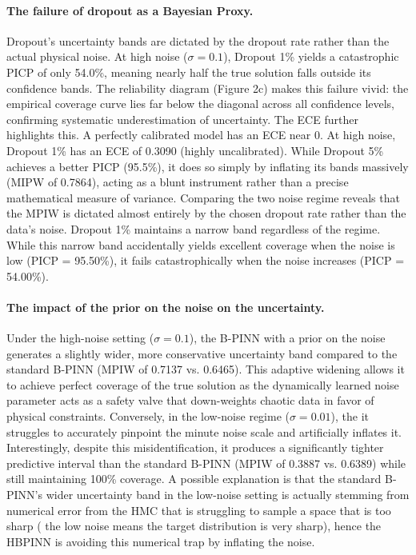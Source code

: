 \documentclass{article}
\begin{document}
\paragraph{The failure of dropout as a Bayesian Proxy.} Dropout's uncertainty bands are dictated by the dropout rate rather than the actual physical noise. At high noise ($\sigma=0.1$), Dropout 1\% yields a catastrophic PICP of only 54.0\%, meaning nearly half the true solution falls outside its confidence bands. The reliability diagram (Figure 2c) makes this failure vivid: the empirical coverage curve lies far below the diagonal across all confidence levels, confirming systematic underestimation of uncertainty. The ECE further highlights this. A perfectly calibrated model has an ECE near 0. At high noise, Dropout 1\% has an ECE of 0.3090 (highly uncalibrated). While Dropout 5\% achieves a better PICP (95.5\%), it does so simply by inflating its bands massively (MIPW of 0.7864), acting as a blunt instrument rather than a precise mathematical measure of variance. Comparing the two noise regime reveals that the MPIW  is dictated almost entirely by the chosen dropout rate rather than the data's noise. Dropout 1\% maintains a narrow band  regardless of the regime. While this narrow band accidentally yields excellent coverage when the noise is low (PICP = 95.50\%), it fails catastrophically when the noise increases (PICP = 54.00\%). 

\paragraph{The impact of the prior on the noise on the uncertainty.}
Under the high-noise setting ($\sigma = 0.1$), the B-PINN with a prior on the noise generates a slightly wider, more conservative uncertainty band compared to the standard B-PINN (MPIW of 0.7137 vs. 0.6465). This adaptive widening allows it to achieve perfect coverage of the true solution as the dynamically learned noise parameter acts as a safety valve that down-weights chaotic data in favor of physical constraints. Conversely, in the low-noise regime ($\sigma = 0.01$), the it struggles to accurately pinpoint the minute noise scale and artificially inflates it. Interestingly, despite this misidentification, it produces a significantly tighter predictive interval than the standard B-PINN (MPIW of 0.3887 vs. 0.6389) while still maintaining 100\% coverage.
A possible explanation is that the standard B-PINN's wider uncertainty band in the low-noise setting is actually stemming from numerical error from the HMC that is struggling to sample a space that is too sharp ( the low noise means the target distribution is very sharp), hence the HBPINN is avoiding this numerical trap by inflating the noise.
\end{document}
